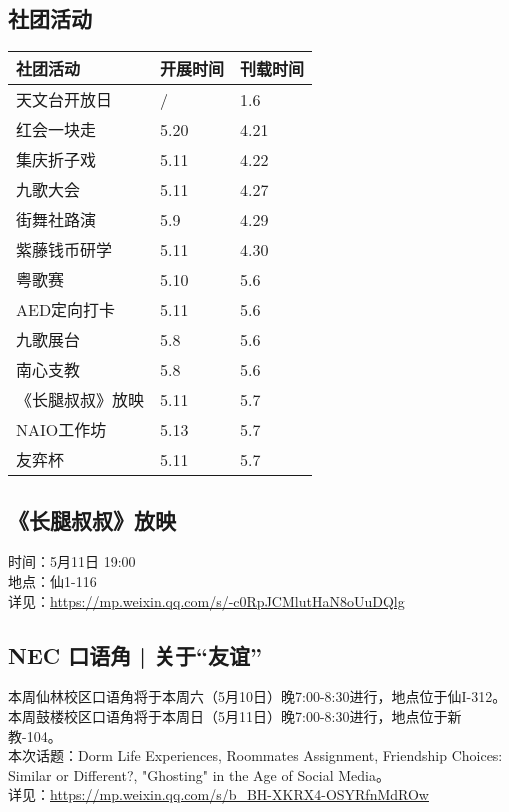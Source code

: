\documentclass[letterpaper, 12pt]{article}
\begin{document}
\begin{multicols}{2}
\section{社团活动}
\begin{tabular}{|>{\centering\arraybackslash}m{}|m{}|m{}|}
    \hline
    社团活动 & 开展时间 & 刊载时间\\
    \hline\hline
    天文台开放日 & / & 1.6\\
    红会一块走 & 5.20 & 4.21\\
    集庆折子戏 & 5.11 & 4.22\\
    九歌大会 & 5.11 & 4.27\\
    街舞社路演 & 5.9 & 4.29\\
    紫藤钱币研学 & 5.11 & 4.30\\
    粤歌赛 & 5.10 & 5.6\\
    AED定向打卡 & 5.11 & 5.6\\
    九歌展台 & 5.8 & 5.6\\
    南心支教 & 5.8 & 5.6\\
    《长腿叔叔》放映 & 5.11 & 5.7\\
    NAIO工作坊 & 5.13 & 5.7\\
    友弈杯 & 5.11 & 5.7\\
    
    \hline
\end{tabular}
\subsection{《长腿叔叔》放映} %
时间：5月11日 19:00
\\地点：仙1-116
\\详见：\url{https://mp.weixin.qq.com/s/-c0RpJCMlutHaN8oUuDQlg}

\subsection{NEC 口语角 | 关于“友谊”} %
本周仙林校区口语角将于本周六（5月10日）晚7:00-8:30进行，地点位于仙I-312。
\\本周鼓楼校区口语角将于本周日（5月11日）晚7:00-8:30进行，地点位于新教-104。
\\本次话题：Dorm Life Experiences, Roommates Assignment, Friendship Choices: Similar or Different?‌, "Ghosting" in the Age of Social Media。
\\详见：\url{https://mp.weixin.qq.com/s/b_BH-XKRX4-OSYRfnMdROw}


\end{multicols}
\end{document}
